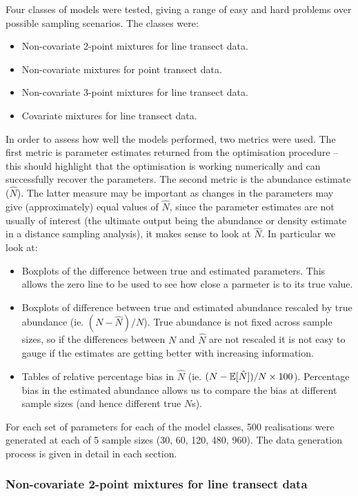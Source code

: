 Four classes of models were tested, giving a range of easy and hard problems over possible sampling scenarios. The classes were:
\begin{itemize}
	\item Non-covariate 2-point mixtures for line transect data.
	\item Non-covariate mixtures for point transect data.
	\item Non-covariate 3-point mixtures for line transect data.
	\item Covariate mixtures for line transect data.
\end{itemize}
In order to assess how well the models performed, two metrics were used. The first metric is parameter estimates returned from the optimisation procedure -- this should highlight that the optimisation is working numerically and can successfully recover the parameters. The second metric is the abundance estimate ($\hat{N}$). The latter measure may be important as changes in the parameters may give (approximately) equal values of $\hat{N}$, since the parameter estimates are not usually of interest (the ultimate output being the abundance or density estimate in a distance sampling analysis), it makes sense to look at $\hat{N}$. In particular we look at:
\begin{itemize}
   \item Boxplots of the difference between true and estimated parameters. This allows the zero line to be used to see how close a parmeter is to its true value.
   \item Boxplots of difference between true and estimated abundance rescaled by true abundance (ie. $(N-\hat{N})/N$). True abundance is not fixed across sample sizes, so if the differences between $N$ and $\hat{N}$ are not rescaled it is not easy to gauge if the estimates are getting better with increasing information.
   \item Tables of relative percentage bias in $\hat{N}$ (ie. $(N-\mathbb{E}[\hat{N}])/N \times 100$). Percentage bias in the estimated abundance allows us to compare the bias at different sample sizes (and hence different true $N$s). 
\end{itemize}

For each set of parameters for each of the model classes, 500 realisations were generated at each of 5 sample sizes (30, 60, 120, 480, 960). The data generation process is given in detail in each section.

\subsubsection{Non-covariate 2-point mixtures for line transect data}

